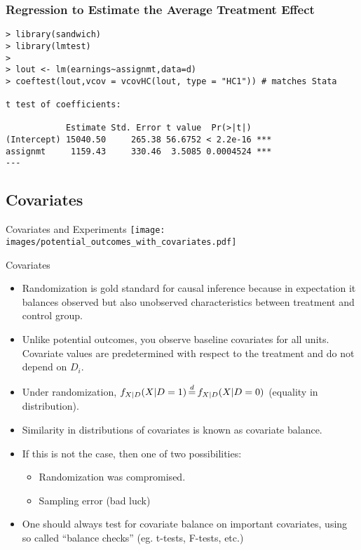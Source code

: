 \documentclass{beamer}
\numberwithin{equation}{section}
\begin{document}
\begin{frame}[fragile]
\frametitle{Regression to Estimate the Average Treatment Effect}
{
\footnotesize
\begin{Verbatim}[frame=single, label=R Code, commandchars=\\\{\}]
> library(sandwich)
> library(lmtest)
> 
> lout <- lm(earnings~assignmt,data=d)
> coeftest(lout,vcov = vcovHC(lout, type = "HC1")) # matches Stata

t test of coefficients:

            Estimate Std. Error t value  Pr(>|t|)    
(Intercept) 15040.50     265.38 56.6752 < 2.2e-16 ***
assignmt     1159.43     330.46  3.5085 0.0004524 ***
---
\end{Verbatim}
}
\end{frame}

\subsection{Covariates}


\begin{frame}{Covariates and Experiments}
\centering
    \texttt{[image: images/potential\_outcomes\_with\_covariates.pdf]}
\end{frame}

\begin{frame}{Covariates}

\begin{itemize}
\itemsep1pt\parskip0pt
 \item Randomization is gold standard for causal inference because in expectation it balances \alert{observed} but also \alert{unobserved} characteristics between treatment and control group.\medskip
\item  Unlike potential outcomes, you observe baseline covariates for all units. Covariate values are predetermined with respect to the
treatment and do not depend on $D_i$. \medskip
\item  Under  randomization, $f_{X|D}(X|D=1) \,{\buildrel d \over =}\, f_{X|D}(X|D=0)$   (equality in distribution).\medskip
\item
  Similarity in distributions of covariates is known as
\alert{covariate balance}.\medskip
\item
  If this is not the case, then one of two possibilities: \pause
  \begin{itemize}
  \itemsep1pt\parskip0pt
  \item
    Randomization was compromised.
  \item
    Sampling error (bad luck) 
  \end{itemize}\medskip
\item
  One should always test for covariate balance on important covariates, using so called ``balance checks'' (eg. t-tests, F-tests, etc.)
\end{itemize}

\end{frame}
\end{document}

